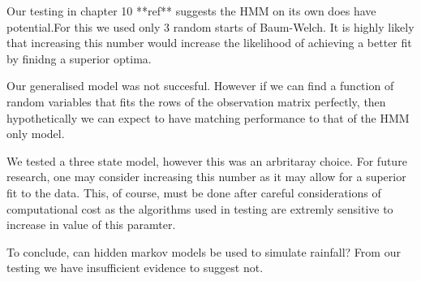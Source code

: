 Our testing in chapter 10 **ref** suggests the HMM on its own does have potential.For this we used only 3 random starts of Baum-Welch. It is highly likely that increasing this number would increase the likelihood of achieving a better fit by finidng a superior optima.  

Our generalised model was not succesful. However if we can find a function of random variables that fits the rows of the observation matrix perfectly, then hypothetically we can expect to have matching performance to that of the HMM only model. 

We tested a three state model, however this was an arbritaray choice. For future research, one may consider increasing this number as it may allow for a superior fit to the data. This, of course, must be done after careful considerations of computational cost as the algorithms used in testing are extremly sensitive to increase in value of this paramter.

To conclude, can hidden markov models be used to simulate rainfall? From our testing we have insufficient evidence to suggest not.